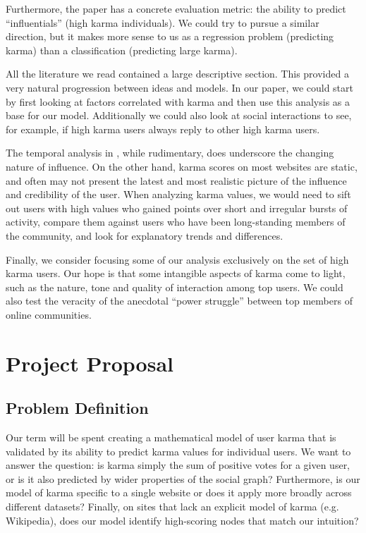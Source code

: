 \documentclass[10pt]{article}
\begin{document}
Furthermore, the paper has a concrete evaluation metric: the ability to predict
``influentials'' (high karma individuals). We could try to pursue a similar
direction, but it makes more sense to us as a regression problem (predicting
karma) than a classification (predicting large karma).

All the literature we read contained a large descriptive section. This provided
a very natural progression between ideas and models. In our paper, we could
start by first looking at factors correlated with karma and then use this
analysis as a base for our model. Additionally we could also look at social
interactions to see, for example, if high karma users always reply to other high
karma users.

The temporal analysis in \citet{cha2010measuring}, while rudimentary, does
underscore the changing nature of influence. On the other hand, karma scores on
most websites are static, and often may not present the latest and most
realistic picture of the influence and credibility of the user. 
When analyzing karma values, we would need to sift out users with high values
who gained points over short and irregular bursts of activity, compare them
against users who have been long-standing members of the community, and look for
explanatory trends and differences.

Finally, we consider focusing some of our analysis exclusively on the set of
high karma users. Our hope is that some intangible aspects of karma come to
light, such as the nature, tone and quality of interaction among top users. We
could also test the veracity of the anecdotal ``power struggle'' between top
members of online communities.

\section{Project Proposal} \subsection{Problem Definition}
Our term will be spent creating a mathematical model of user karma that is
validated by its ability to predict karma values for individual users. We want
to answer the question: is karma simply the sum of positive votes for a given
user, or is it also predicted by wider properties of the social graph?
Furthermore, is our model of karma specific to a single website or does it apply
more broadly across different datasets?  Finally, on sites that lack an explicit
model of karma (e.g. Wikipedia), does our model identify high-scoring nodes that
match our intuition?
\end{document}
